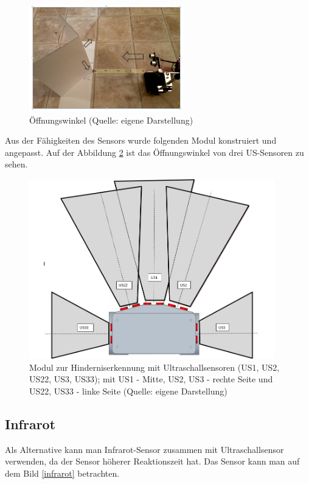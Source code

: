 \begin{figure}[!h]  %
	\centering\includegraphics[width=0.6\textwidth]{images/Bild-7.png}
	\caption{Öffnungswinkel (Quelle: eigene Darstellung)}
	\label{bild_7} %
\end{figure}

Aus der Fähigkeiten des Sensors wurde folgenden Modul konstruiert und angepasst. Auf der Abbildung \ref{H-Mod} ist das Öffnungswinkel von drei US-Sensoren zu sehen.

\begin{figure}[!h]  %
	\centering\includegraphics[width=0.95\textwidth]{images/H-Mod.jpg}
	\caption{Modul zur Hinderniserkennung mit Ultraschallsensoren (US1, US2, US22, US3, US33); mit US1 - Mitte, US2, US3 - rechte Seite und US22, US33 - linke Seite  (Quelle: eigene Darstellung)}
	\label{H-Mod} 
\end{figure}

\subsection{Infrarot}
Als Alternative kann man Infrarot-Sensor zusammen mit Ultraschallsensor verwenden, da der Sensor höherer Reaktionszeit hat. Das Sensor kann man auf dem  Bild \ref{infrarot} betrachten.

